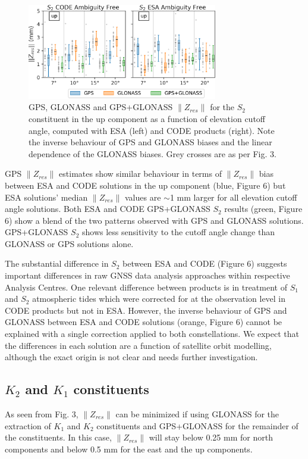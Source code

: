 \documentclass[se, manuscript]{copernicus}
\begin{document}
\begin{figure}[t]
\includegraphics[width=8.3cm]{fig06.png}
\caption{GPS, GLONASS and GPS+GLONASS $\|Z_{res}\|$ for the $S_2$ constituent in the up component as a function of elevation cutoff angle, computed with ESA (left) and CODE products (right). Note the inverse behaviour of GPS and GLONASS biases and the linear dependence of the GLONASS biases. Grey crosses are as per Fig. 3.}
\end{figure}

GPS $\|Z_{res}\|$ estimates show similar behaviour in terms of $\|Z_{res}\|$ bias between ESA and CODE solutions in the up component (blue, Figure 6) but ESA solutions' median $\|Z_{res}\|$ values are $\sim$1 mm larger for all elevation cutoff angle solutions. Both ESA and CODE GPS+GLONASS $S_2$ results (green, Figure 6) show a blend of the two patterns observed with GPS and GLONASS solutions. GPS+GLONASS $S_2$ shows less sensitivity to the cutoff angle change than GLONASS or GPS solutions alone.

The substantial difference in $S_2$ between ESA and CODE (Figure 6) suggests important differences in raw GNSS data analysis approaches within respective Analysis Centres. One relevant difference between products is in treatment of $S_1$ and $S_2$ atmospheric tides which were corrected for at the observation level in CODE products but not in ESA. However, the inverse behaviour of GPS and GLONASS between ESA and CODE solutions (orange, Figure 6) cannot be explained with a single correction applied to both constellations. We expect that the differences in each solution are a function of satellite orbit modelling, although the exact origin is not clear and needs further investigation.

\subsection{$K_2$ and $K_1$ constituents}
As seen from Fig. 3, $\| Z_{res}\|$ can be minimized if using GLONASS for the extraction of $K_1$ and $K_2$ constituents and GPS+GLONASS for the remainder of the constituents. In this case, $\| Z_{res}\|$ will stay below 0.25 mm for north components and below 0.5 mm for the east and the up components.
\end{document}
